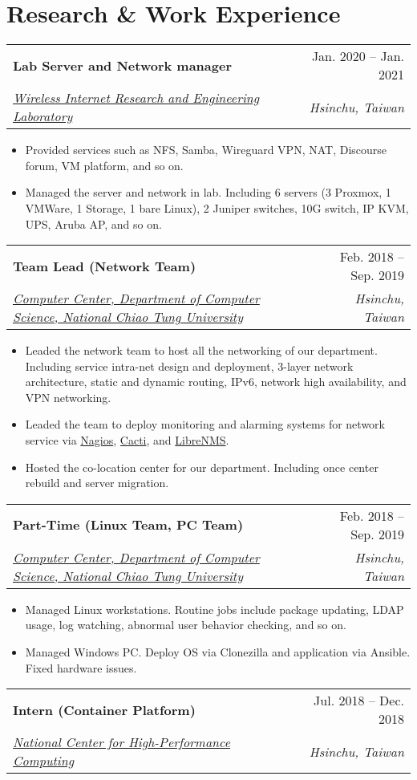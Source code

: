 \documentclass[letterpaper,11pt]{article}
\makeatletter
\newcommand{\resumeItemTwo}[1]{
  \item\small{
    {#1 \vspace{-2pt}}
  }
}
\newcommand{\resumeSubheading}[4]{
  \vspace{1pt}%
    \begin{tabular*}{0.97\textwidth}{l@{\extracolsep{\fill}}r}
      \textbf{#1} & #2 \\
      \textit{\small#3} & \textit{\small #4} \\
    \end{tabular*}\vspace{-5pt}
}
\newcommand{\resumeSubHeadingListStart}{}%
\newcommand{\resumeItemListStart}{\begin{itemize}}
\newcommand{\resumeItemListEnd}{\end{itemize}\vspace{-5pt}}
\makeatother
\begin{document}
\section{Research \& Work Experience}
  \resumeSubHeadingListStart
    \resumeSubheading
      {Lab Server and Network manager}{Jan. 2020 -- Jan. 2021}
      {\href{http://wire.cs.nctu.edu.tw/}{Wireless Internet Research and Engineering Laboratory}}{Hsinchu, Taiwan}
      \resumeItemListStart
        \resumeItemTwo{Provided services such as NFS, Samba, Wireguard VPN, NAT, Discourse forum, VM platform, and so on.}
        \resumeItemTwo{Managed the server and network in lab. Including 6 servers (3 Proxmox, 1 VMWare, 1 Storage, 1 bare Linux), 2 Juniper switches, 10G switch, IP KVM, UPS, Aruba AP, and so on.}
      \resumeItemListEnd
    \resumeSubheading
      {Team Lead (Network Team)}{Feb. 2018 -- Sep. 2019}
      {\href{https://it.cs.nycu.edu.tw/}{Computer Center, Department of Computer Science, National Chiao Tung University}}{Hsinchu, Taiwan}
      \resumeItemListStart
        \resumeItemTwo{Leaded the network team to host all the networking of our department. Including service intra-net design and deployment, 3-layer network architecture, static and dynamic routing, IPv6, network high availability, and VPN networking.}
        \resumeItemTwo{Leaded the team to deploy monitoring and alarming systems for network service via \href{https://www.nagios.org/}{Nagios}, \href{https://www.cacti.net/}{Cacti}, and \href{https://www.librenms.org/}{LibreNMS}.}
        \resumeItemTwo{Hosted the co-location center for our department. Including once center rebuild and server migration.}
      \resumeItemListEnd
    \resumeSubheading
      {Part-Time (Linux Team, PC Team)}{Feb. 2018 -- Sep. 2019}
      {\href{https://it.cs.nycu.edu.tw/}{Computer Center, Department of Computer Science, National Chiao Tung University}}{Hsinchu, Taiwan}
      \resumeItemListStart
        \resumeItemTwo{Managed Linux workstations. Routine jobs include package updating, LDAP usage, log watching, abnormal user behavior checking, and so on.}
        \resumeItemTwo{Managed Windows PC. Deploy OS via Clonezilla and application via Ansible. Fixed hardware issues.}
      \resumeItemListEnd
    \resumeSubheading
      {Intern (Container Platform)}{Jul. 2018 -- Dec. 2018}
      {\href{https://www.nchc.org.tw/}{National Center for High-Performance Computing}}{Hsinchu, Taiwan}
\end{document}
